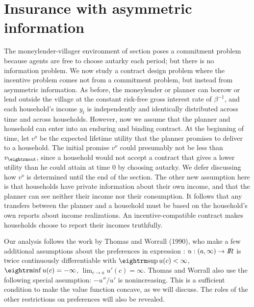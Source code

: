 \section{Insurance with asymmetric information}
%
%
 The moneylender-villager environment of
section  poses a
commitment problem  because  agents are free to choose autarky
each period; but there is  no information problem. We now study a
contract design problem where the incentive problem comes not from
a commitment problem, but instead from asymmetric information. As
before, the moneylender or planner can borrow or lend outside the village at the
constant risk-free gross interest rate of $\beta^{-1}$, and each
household's income $y_t$ is independently and identically
distributed across time and across households. However, now we
assume that the planner and household can  enter
into an enduring and   binding contract. At the beginning of time,
let $v^o$ be the expected lifetime utility that the planner
promises to deliver to a household. The initial promise $v^o$
could presumably not be less than $v_{\rm aut}$, since a household
would not accept a contract that gives a lower utility than he could attain at time $0$ by choosing autarky.
 We defer discussing how $v^o$ is
determined until the end of the section. The other new assumption
here is that households have private information about their own
income, and that the planner can see neither their income nor their
consumption. It follows that any transfers between the
planner and a household must be based on the household's own
reports about income realizations. An incentive-compatible
contract makes households choose to report their incomes
truthfully.

Our analysis follows the work by Thomas and Worrall (1990),
%
 who
make a few additional assumptions about the preferences in expression :
$u:(a, \infty) \rightarrow {{I\kern-0.3em R}}$ is twice continuously
differentiable with ${\rm sup}\,u(c)<\infty$, ${\rm inf}\,u(c)=-\infty$,
$\lim_{c\rightarrow a}u'(c)=\infty$.
Thomas and Worrall also use the following special assumption:
\medskip
{}  $-u''/u'$ is nonincreasing.
\medskip
\noindent
This is a sufficient condition to make the value function
concave, as we will discuss.  The roles of the other restrictions
on preferences will also be revealed.
%
%

